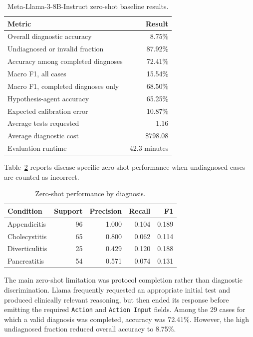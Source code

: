 \documentclass[11pt]{article}
\begin{document}
\begin{table}[ht]
    \centering
    \caption{Meta-Llama-3-8B-Instruct zero-shot baseline results.}
    \label{tab:baseline}
    \begin{tabular}{lr}
        \toprule
        Metric & Result \\
        \midrule
        Overall diagnostic accuracy & 8.75\% \\
        Undiagnosed or invalid fraction & 87.92\% \\
        Accuracy among completed diagnoses & 72.41\% \\
        Macro F1, all cases & 15.54\% \\
        Macro F1, completed diagnoses only & 68.50\% \\
        Hypothesis-agent accuracy & 65.25\% \\
        Expected calibration error & 10.87\% \\
        Average tests requested & 1.16 \\
        Average diagnostic cost & \$798.08 \\
        Evaluation runtime & 42.3 minutes \\
        \bottomrule
    \end{tabular}
\end{table}

Table~\ref{tab:disease} reports disease-specific zero-shot performance when
undiagnosed cases are counted as incorrect.

\begin{table}[ht]
    \centering
    \caption{Zero-shot performance by diagnosis.}
    \label{tab:disease}
    \begin{tabular}{lrrrr}
        \toprule
        Condition & Support & Precision & Recall & F1 \\
        \midrule
        Appendicitis & 96 & 1.000 & 0.104 & 0.189 \\
        Cholecystitis & 65 & 0.800 & 0.062 & 0.114 \\
        Diverticulitis & 25 & 0.429 & 0.120 & 0.188 \\
        Pancreatitis & 54 & 0.571 & 0.074 & 0.131 \\
        \bottomrule
    \end{tabular}
\end{table}

The main zero-shot limitation was protocol completion rather than diagnostic
discrimination. Llama frequently requested an appropriate initial test and
produced clinically relevant reasoning, but then ended its response before
emitting the required \texttt{Action} and \texttt{Action Input} fields. Among
the 29 cases for which a valid diagnosis was completed, accuracy was 72.41\%.
However, the high undiagnosed fraction reduced overall accuracy to 8.75\%.
\end{document}
